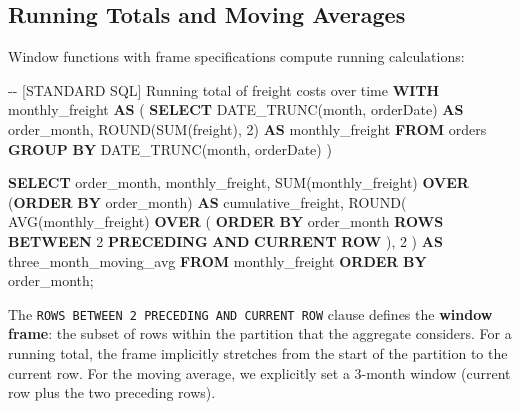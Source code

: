 \documentclass[
  letterpaper,
  DIV=11,
  numbers=noendperiod]{scrreprt}
\newenvironment{Shaded}{\begin{snugshade}}{\end{snugshade}}
\newcommand{\CommentTok}[1]{\textcolor[rgb]{0.37,0.37,0.37}{#1}}
\newcommand{\DecValTok}[1]{\textcolor[rgb]{0.68,0.00,0.00}{#1}}
\newcommand{\FunctionTok}[1]{\textcolor[rgb]{0.28,0.35,0.67}{#1}}
\newcommand{\KeywordTok}[1]{\textcolor[rgb]{0.00,0.23,0.31}{\textbf{#1}}}
\newcommand{\NormalTok}[1]{\textcolor[rgb]{0.00,0.23,0.31}{#1}}
\newcommand{\StringTok}[1]{\textcolor[rgb]{0.13,0.47,0.30}{#1}}
\begin{document}
\subsection{Running Totals and Moving
Averages}\label{running-totals-and-moving-averages}

Window functions with frame specifications compute running calculations:

\begin{codelisting}

\caption{\texttt{duckdb}}

\begin{Shaded}
\begin{Highlighting}[]
\CommentTok{{-}{-} [STANDARD SQL] Running total of freight costs over time}
\KeywordTok{WITH}\NormalTok{ monthly\_freight }\KeywordTok{AS}\NormalTok{ (}
    \KeywordTok{SELECT}
\NormalTok{        DATE\_TRUNC(}\StringTok{\textquotesingle{}month\textquotesingle{}}\NormalTok{, orderDate) }\KeywordTok{AS}\NormalTok{ order\_month,}
        \FunctionTok{ROUND}\NormalTok{(}\FunctionTok{SUM}\NormalTok{(freight), }\DecValTok{2}\NormalTok{) }\KeywordTok{AS}\NormalTok{ monthly\_freight}
    \KeywordTok{FROM}\NormalTok{ orders}
    \KeywordTok{GROUP} \KeywordTok{BY}\NormalTok{ DATE\_TRUNC(}\StringTok{\textquotesingle{}month\textquotesingle{}}\NormalTok{, orderDate)}
\NormalTok{)}

\KeywordTok{SELECT}
\NormalTok{    order\_month,}
\NormalTok{    monthly\_freight,}
    \FunctionTok{SUM}\NormalTok{(monthly\_freight) }\KeywordTok{OVER}\NormalTok{ (}\KeywordTok{ORDER} \KeywordTok{BY}\NormalTok{ order\_month) }\KeywordTok{AS}\NormalTok{ cumulative\_freight,}
    \FunctionTok{ROUND}\NormalTok{(}
        \FunctionTok{AVG}\NormalTok{(monthly\_freight) }\KeywordTok{OVER}\NormalTok{ (}
            \KeywordTok{ORDER} \KeywordTok{BY}\NormalTok{ order\_month}
            \KeywordTok{ROWS} \KeywordTok{BETWEEN} \DecValTok{2} \KeywordTok{PRECEDING} \KeywordTok{AND} \KeywordTok{CURRENT} \KeywordTok{ROW}
\NormalTok{        ), }\DecValTok{2}
\NormalTok{    ) }\KeywordTok{AS}\NormalTok{ three\_month\_moving\_avg}
\KeywordTok{FROM}\NormalTok{ monthly\_freight}
\KeywordTok{ORDER} \KeywordTok{BY}\NormalTok{ order\_month;}
\end{Highlighting}
\end{Shaded}

\end{codelisting}

The \texttt{ROWS\ BETWEEN\ 2\ PRECEDING\ AND\ CURRENT\ ROW} clause
defines the \textbf{window frame}: the subset of rows within the
partition that the aggregate considers. For a running total, the frame
implicitly stretches from the start of the partition to the current row.
For the moving average, we explicitly set a 3-month window (current row
plus the two preceding rows).
\end{document}
